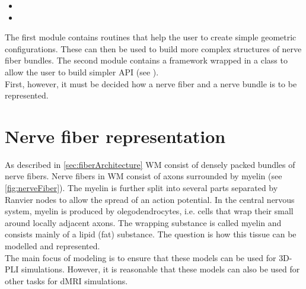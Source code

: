 % 
\begin{itemize}[nosep]
    \item {}
    \item {}
\end{itemize}
% 
The first module  contains routines that help the user to create simple geometric configurations.
These can then be used to build more complex structures of nerve fiber bundles.
The second module  contains a \cpp{} framework wrapped in a \python{} class to allow the user to build simpler \ac{API} (see \dummy{}).
\\
% 
First, however, it must be decided how a nerve fiber and a nerve bundle is to be represented.
% 
% 
% 
\section{Nerve fiber representation}
\label{sec:nerve_fiber_representation}
% 
As described in \cref{sec:fiberArchitecture} \ac{WM} consist of densely packed bundles of nerve fibers.
Nerve fibers in \ac{WM} consist of axons surrounded by myelin (see \cref{fig:nerveFiber}).
The myelin is further split into several parts separated by Ranvier nodes to allow the spread of an action potential.
In the central nervous system, myelin is produced by olegodendrocytes, i.e. cells that wrap their small  around locally adjacent axons.
The wrapping substance is called myelin and consists mainly of a lipid (fat) substance.
The question is how this tissue can be modelled and represented.
\\
% 
The main focus of modeling is to ensure that these models can be used for \ac{3D-PLI} simulations.
However, it is reasonable that these models can also be used for other tasks \eg{} for \ac{dMRI} simulations.
% 
